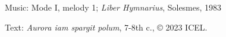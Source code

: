 



\medskip\begin{hymnsource}
Music: Mode I, melody 1; \emph{Liber Hymnarius}, Solesmes, 1983

Text: \emph{Aurora iam spargit polum}, 7-8th c., © 2023 ICEL.
\end{hymnsource}

